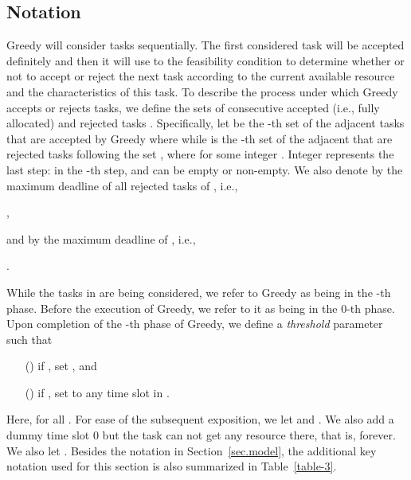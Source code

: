 \documentclass[10pt,journal,compsoc]{IEEEtran}
\newcommand{\rmnum}[1]{\romannumeral #1}
\begin{document}
\subsection{Notation}

Greedy will consider tasks sequentially. The first considered task will be accepted definitely and then it will use to the feasibility condition to determine whether or not to accept or reject the next task according to the current available resource and the characteristics of this task. To describe the process under which Greedy accepts or rejects tasks, we define the sets of consecutive accepted (i.e., fully allocated) and rejected tasks . Specifically, let  be the -th set of the adjacent tasks that are accepted by Greedy where  while  is the -th set of the adjacent that are rejected tasks following the set , where  for some integer .
Integer  represents the last step: in the -th step,  and  can be empty or non-empty. We also denote by  the maximum deadline of all rejected tasks of , i.e.,
\begin{center}
,
\end{center}
and by  the maximum deadline of , i.e.,
\begin{center}
.
\end{center}
While the tasks in  are being considered, we refer to Greedy as being in the -th phase. Before the execution of Greedy, we refer to it as being in the 0-th phase. Upon completion of the -th phase of Greedy, we define a {\em threshold} parameter  such that
\begin{enumerate}
 \setlength\itemsep{0.35em}
\item [(\rmnum{1})] if , set , and
\item [(\rmnum{2})] if , set  to any time slot in .
\end{enumerate}
Here,  for all . For ease of the subsequent exposition, we let  and . We also add a dummy time slot 0 but the task  can not get any resource there, that is,  forever. We also let . Besides the notation in Section~\ref{sec.model}, the additional key notation used for this section is also summarized in Table~\ref{table-3}.
\end{document}
